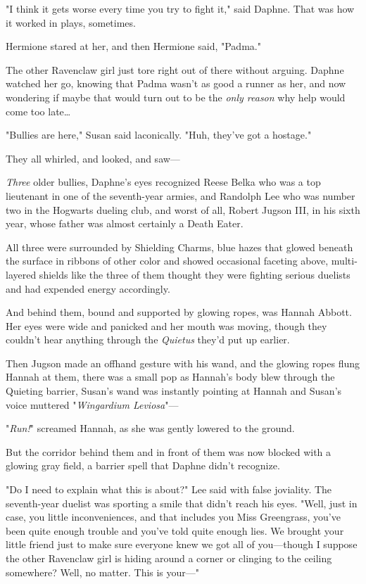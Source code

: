 "I think it gets worse every time you try to fight it," said Daphne. That was 
how it worked in plays, sometimes.

Hermione stared at her, and then Hermione said, "Padma."

The other Ravenclaw girl just tore right out of there without arguing. Daphne 
watched her go, knowing that Padma wasn't as good a runner as her, and now 
wondering if maybe that would turn out to be the \emph{only reason} why help 
would come too late{\ldots}

"Bullies are here," Susan said laconically. "Huh, they've got a hostage."

They all whirled, and looked, and saw---

\emph{Three} older bullies, Daphne's eyes recognized Reese Belka who was a top 
lieutenant in one of the seventh-year armies, and Randolph Lee who was number 
two in the Hogwarts dueling club, and worst of all, Robert Jugson III, in his 
sixth year, whose father was almost certainly a Death Eater.

All three were surrounded by Shielding Charms, blue hazes that glowed beneath 
the surface in ribbons of other color and showed occasional faceting above, 
multi-layered shields like the three of them thought they were fighting serious 
duelists and had expended energy accordingly.

And behind them, bound and supported by glowing ropes, was Hannah Abbott. Her 
eyes were wide and panicked and her mouth was moving, though they couldn't hear 
anything through the \emph{Quietus} they'd put up earlier.

Then Jugson made an offhand gesture with his wand, and the glowing ropes flung 
Hannah at them, there was a small pop as Hannah's body blew through the 
Quieting barrier, Susan's wand was instantly pointing at Hannah and Susan's 
voice muttered "\emph{Wingardium Leviosa}"---

"\emph{Run!}" screamed Hannah, as she was gently lowered to the ground.

But the corridor behind them and in front of them was now blocked with a 
glowing gray field, a barrier spell that Daphne didn't recognize.

"Do I need to explain what this is about?" Lee said with false joviality. The 
seventh-year duelist was sporting a smile that didn't reach his eyes. "Well, 
just in case, you little inconveniences, and that includes you Miss Greengrass, 
you've been quite enough trouble and you've told quite enough lies. We brought 
your little friend just to make sure everyone knew we got all of you---though I 
suppose the other Ravenclaw girl is hiding around a corner or clinging to the 
ceiling somewhere? Well, no matter. This is your---"

